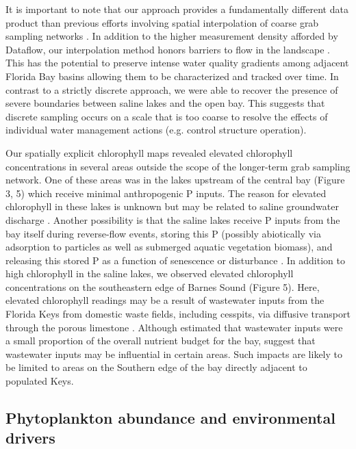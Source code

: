 It is important to note that our approach provides a fundamentally different data product than previous efforts involving spatial interpolation of coarse grab sampling networks \citep{fourqurean1993process}. In addition to the higher measurement density afforded by Dataflow, our interpolation method honors barriers to flow in the landscape \citep{stachelek_application_2015}. This has the potential to preserve intense water quality gradients among adjacent Florida Bay basins allowing them to be characterized and tracked over time. In contrast to a strictly discrete approach, we were able to recover the presence of severe boundaries between saline lakes and the open bay. This suggests that discrete sampling occurs on a scale that is too coarse to resolve the effects of individual water management actions (e.g. control structure operation).

Our spatially explicit chlorophyll maps revealed elevated chlorophyll concentrations in several areas outside the scope of the longer-term grab sampling network. One of these areas was in the lakes upstream of the central bay (Figure 3, 5) which receive minimal anthropogenic P inputs. The reason for elevated chlorophyll in these lakes is unknown but may be related to saline groundwater discharge \citep{price2006coastal}. Another possibility is that the saline lakes receive P inputs from the bay itself during reverse-flow events, storing this P (possibly abiotically via adsorption to particles as well as submerged aquatic vegetation biomass), and releasing this stored P as a function of senescence or disturbance \citep{rudnick1999phosphorus}. In addition to high chlorophyll in the saline lakes, we observed elevated chlorophyll concentrations on the southeastern edge of Barnes Sound (Figure 5). Here, elevated chlorophyll readings may be a result of wastewater inputs from the Florida Keys from domestic waste fields, including cesspits, via diffusive transport through the porous limestone \citep{rudnick1999phosphorus}. Although \citet{rudnick1999phosphorus} estimated that wastewater inputs were a small proportion of the overall nutrient budget for the bay, \citet{szmant1996water} suggest that wastewater inputs may be influential in certain areas. Such impacts are likely to be limited to areas on the Southern edge of the bay directly adjacent to populated Keys.

\subsection{Phytoplankton abundance and environmental drivers}
\label{phytoabund}

